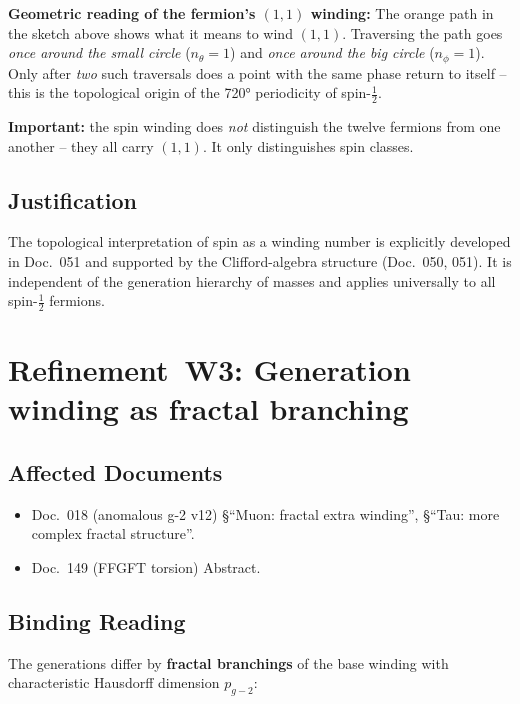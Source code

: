 \textbf{Geometric reading of the fermion's $(1,1)$ winding:}
The orange path in the sketch above shows what it means to wind
$(1,1)$. Traversing the path goes \emph{once around the small circle}
($n_\theta = 1$) and \emph{once around the big circle} ($n_\phi = 1$).
Only after \emph{two} such traversals does a point with the same
phase return to itself -- this is the topological origin of the 720°
periodicity of spin-$\tfrac12$.

\textbf{Important:} the spin winding does \emph{not} distinguish the
twelve fermions from one another -- they all carry $(1,1)$. It only
distinguishes spin classes.

\subsection*{Justification}

The topological interpretation of spin as a winding number is
explicitly developed in Doc.~051 and supported by the Clifford-algebra
structure (Doc.~050, 051). It is independent of the generation
hierarchy of masses and applies universally to all
spin-$\tfrac12$ fermions.

\section{\texorpdfstring{Refinement~W3: Generation winding as fractal branching}{Refinement W3: Generation winding as fractal branching}}

\subsection*{Affected Documents}

\begin{itemize}
  \item Doc.~018 (anomalous g-2 v12) §\enquote{Muon: fractal extra
        winding}, §\enquote{Tau: more complex fractal structure}.
  \item Doc.~149 (FFGFT torsion) Abstract.
\end{itemize}

\subsection*{Binding Reading}

The generations differ by \textbf{fractal branchings} of the base
winding with characteristic Hausdorff dimension $p_{g\!-\!2}$:


